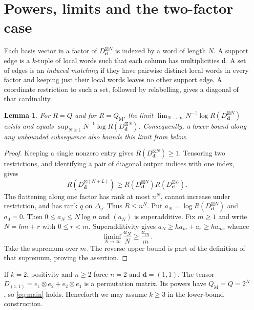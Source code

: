\documentclass[10pt,a4paper]{article}
\newtheorem{lemma}[theorem]{Lemma}
\theoremstyle{definition}
\theoremstyle{remark}
\numberwithin{equation}{section}
\newcommand{\Qmon}{Q_{\mathrm M}}
\begin{document}


\section{Powers, limits and the two-factor case}\label{sec:limits}

Each basis vector in a factor of $D_{\mathbf d}^{\boxtimes N}$ is
indexed by a word of length $N$. A support edge is a $k$-tuple of local
words such that each column has multiplicities $\mathbf d$. A set of
edges is an \emph{induced matching} if they have pairwise distinct local
words in every factor and keeping just their local words leaves no
other support edge. A coordinate restriction to such a set, followed
by relabelling, gives a diagonal of that cardinality.

\begin{lemma}\label{lem:limits}
For $R=Q$ and for $R=\Qmon$, the limit
$\lim_{N\to\infty}N^{-1}\log R(D_{\mathbf d}^{\boxtimes N})$
exists and equals
$\sup_{N\geq1}N^{-1}\log R(D_{\mathbf d}^{\boxtimes N})$.
Consequently, a lower bound along any unbounded subsequence also
bounds this limit from below.
\end{lemma}
\begin{proof}
Keeping a single nonzero entry gives $R(D_{\mathbf d}^{\boxtimes N})\geq1$.
Tensoring two restrictions, and identifying a pair of diagonal output
indices with one index, gives
\begin{equation}\label{eq:supermultiplicativity}
 R(D_{\mathbf d}^{\boxtimes(N+L)})
   \geq R(D_{\mathbf d}^{\boxtimes N})R(D_{\mathbf d}^{\boxtimes L}).
\end{equation}
The flattening along one factor has rank at most $n^N$, cannot increase
under restriction, and has rank $q$ on $\Delta_q$. Thus $R\leq n^N$.
Put $a_N=\log R(D_{\mathbf d}^{\boxtimes N})$ and $a_0=0$.
Then $0\leq a_N\leq N\log n$ and $(a_N)$ is superadditive.
Fix $m\geq1$ and write $N=hm+r$ with $0\leq r<m$. Superadditivity
gives $a_N\geq h a_m+a_r\geq h a_m$, whence
\[
 \liminf_{N\to\infty}\frac{a_N}{N}\geq\frac{a_m}{m}.
\]
Take the supremum over $m$. The reverse upper bound is part of the
definition of that supremum, proving the assertion.
\end{proof}

If $k=2$, positivity and $n\geq2$ force $n=2$ and $\mathbf d=(1,1)$.
The tensor $D_{(1,1)}=e_1\otimes e_2+e_2\otimes e_1$ is a permutation
matrix. Its powers have $\Qmon=Q=2^N$, so \eqref{eq:main} holds.
Henceforth we may assume $k\geq3$ in the lower-bound construction.
\end{document}
